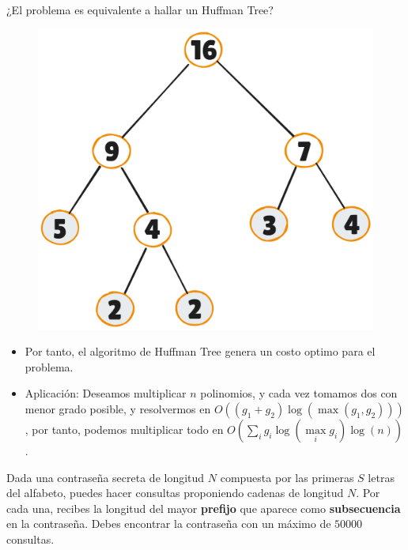 \documentclass[12pt]{beamer}
\begin{document}
\begin{frame}
\begin{bloque}
¿El problema es equivalente a hallar un Huffman Tree?

\begin{figure}
    \centering
    \includegraphics[width=0.4\linewidth]{img/ht3.png}
    \label{fig:enter-label}
\end{figure}

\end{bloque}
\end{frame}

\begin{frame}
\begin{bloque}

\begin{itemize}
    \item Por tanto, el algoritmo de Huffman Tree genera un costo optimo para el problema. 
    \pause
    \item Aplicación: Deseamos multiplicar $n$ polinomios, y cada vez tomamos dos con menor grado posible, y resolvermos en $O((g_1 + g_2)\log(\max(g_1, g_2)))$, por tanto, podemos multiplicar todo en $O(\sum\limits_i g_i \log(\max\limits_i g_i)\log(n))$.
\end{itemize}

\end{bloque}
\end{frame}

\begin{frame}
\begin{bloque}

Dada una contraseña secreta de longitud $N$ compuesta por las primeras $S$ letras del alfabeto, puedes hacer consultas proponiendo cadenas de longitud $N$. Por cada una, recibes la longitud del mayor \textbf{prefijo} que aparece como \textbf{subsecuencia} en la contraseña. Debes encontrar la contraseña con un máximo de $50000$ consultas.

\end{bloque}
\end{frame}
\end{document}
